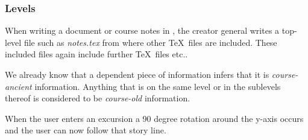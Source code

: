 
\begin{frame}
  \frametitle{Levels}
  \begin{module}[id=levels]

When writing a document or course notes in \stex, the creator general writes a top-level file such as \textit{notes.tex} from where other \TeX\ files are included. These included files again include further \TeX\ files etc.. 

We already know that a dependent piece of information infers that it is \textit{course-ancient} information. Anything that is on the same level or in the sublevels thereof is considered to be \textit{course-old} information.


When the user enters an excursion a 90 degree rotation around the y-axis occurs and the user can now follow that story line.


\end{module}
\end{frame}
